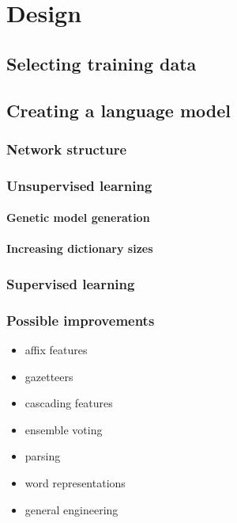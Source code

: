 
\chapter{Design}
\label{chp:design}

\section{Selecting training data}
\label{sec:trainingdata}

\section{Creating a language model}
\label{sec:training-nn}

\subsection{Network structure}
\label{sec:networkstructure}

\subsection{Unsupervised learning}
\label{sec:unsupervised}

\subsubsection{Genetic model generation}
\label{sec:geneticmodels}

\subsubsection{Increasing dictionary sizes}
\label{sec:curricula}



\subsection{Supervised learning}
\label{sec:supervised}

\subsection{Possible improvements}
\label{sec:supervised}

\begin{itemize}
  \item affix features
  \item gazetteers
  \item cascading features
  \item ensemble voting
  \item parsing
  \item word representations
  \item general engineering
\end{itemize}



